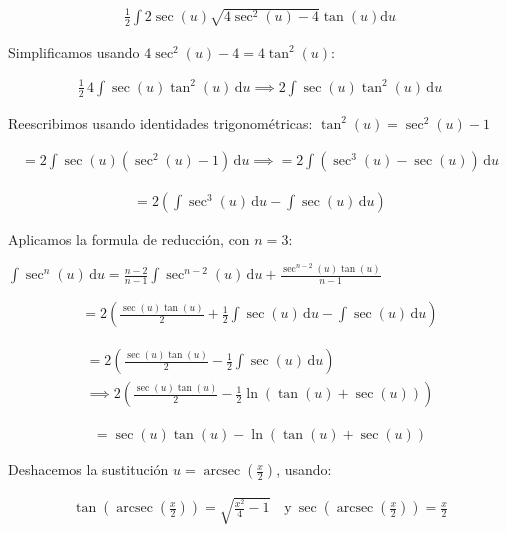 \documentclass[12pt]{article}
\DeclareMathOperator{\arcsec}{arcsec}
\begin{document}
\begin{align*}
	\frac{1}{2} \int 2\sec(u)\sqrt{4\sec^2(u)-4}\tan(u) \mathrm{d}u
\end{align*}

\noindent Simplificamos usando $4\sec^2(u)-4 = 4\tan^2(u)$:

\begin{align*}
	\frac{1}{2}\, 4\int \sec(u)\tan^2(u)\, \mathrm{d}u \implies 2\int \sec(u)\tan^2(u)\, \mathrm{d}u
\end{align*}

\noindent Reescribimos usando identidades trigonométricas: $\tan^2(u)=\sec^2(u)-1$

\begin{align*}
	= 2\int \sec(u)(\sec^2(u)-1)\, \mathrm{d}u \implies = 2\int (\sec^3(u)-\sec(u))\, \mathrm{d}u
\end{align*}

\begin{align*}
	= 2\left(\int \sec^3(u)\, \mathrm{d}u - \int \sec(u)\, \mathrm{d}u\right)
\end{align*}

\noindent Aplicamos la formula de reducción, con $n=3$:

\begin{center}
	$\int \sec^n(u)\, \mathrm{d}u = \frac{n-2}{n-1} \int \sec^{n-2}(u)\, \mathrm{d}u + \frac{\sec^{n-2}(u)\tan(u)}{n-1}$
\end{center}

\begin{align*}
	= 2\left(\frac{\sec(u)\tan(u)}{2} + \frac{1}{2} \int \sec(u)\, \mathrm{d}u - \int \sec(u)\, \mathrm{d}u\right)
\end{align*}

\begin{multline*}
	= 2\left(\frac{\sec(u)\tan(u)}{2} - \frac{1}{2}\int \sec(u)\, \mathrm{d}u\right) \\\implies 2\left(\frac{\sec(u)\tan(u)}{2} - \frac{1}{2}\ln(\tan(u)+\sec(u))\right)
\end{multline*}

\begin{align*}
	= \sec(u)\tan(u) - \ln(\tan(u)+\sec(u))
\end{align*}

\noindent Deshacemos la sustitución $u = \arcsec(\frac{x}{2})$, usando:

\begin{align*}
	\tan\left(\arcsec\left(\frac{x}{2}\right)\right)=\sqrt{\frac{x^2}{4}-1}\quad \mathrm{y} \
	\sec\left(\arcsec\left(\frac{x}{2}\right)\right)=\frac{x}{2}
\end{align*}
\end{document}
